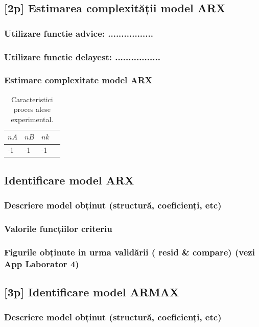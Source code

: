 \documentclass[12pt,english]{article}
\begin{document}
\subsection { [2p] Estimarea complexității model ARX }
\subsubsection { Utilizare functie advice: ................. }
\subsubsection { Utilizare functie delayest: ................. }
\subsubsection { Estimare complexitate model ARX }
\begin{table}[H]
  \centering
    \begin{tabular}{|l|l|l|l|}
      \hline
      $nA$ & $nB$ & $nk$ \\
      \hline
      -1 & -1 & -1 \\
      \hline
    \end{tabular}
    \caption{Caracteristici proces alese experimental.}
\end{table}

\subsection { Identificare model ARX }
\subsubsection { Descriere model obținut (structură, coeficienți, etc) }
\subsubsection { Valorile funcțiilor criteriu }
\subsubsection { Figurile obținute in urma validării ( resid \& compare) (vezi App Laborator 4) }
\subsection { [3p] Identificare model ARMAX }
\subsubsection { Descriere model obținut (structură, coeficienți, etc) }
\end{document}
